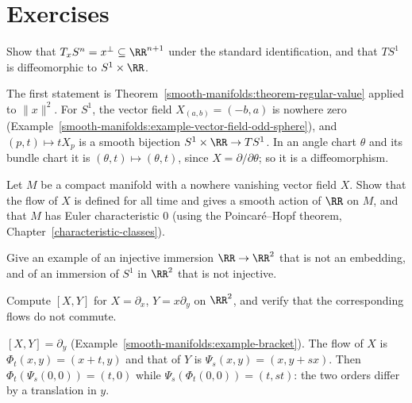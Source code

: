 \section{Exercises}\label{smooth-manifolds:section-exercises}

\begin{exercise}\label{smooth-manifolds:exercise-tangent-sphere}
Show that $T_xS^n = x^\perp \subseteq \RR^{n+1}$ under the standard identification, and that $TS^1$ is diffeomorphic to $S^1 \times \RR$.
\end{exercise}

\begin{solution}
The first statement is Theorem~\ref{smooth-manifolds:theorem-regular-value} applied to $\|x\|^2$. For $S^1$, the vector field $X_{(a,b)} = (-b, a)$ is nowhere
zero (Example~\ref{smooth-manifolds:example-vector-field-odd-sphere}), and $(p, t) \mapsto tX_p$ is a smooth bijection $S^1 \times \RR \to TS^1$. In an angle
chart $\theta$ and its bundle chart it is $(\theta, t) \mapsto (\theta, t)$, since $X = \partial/\partial\theta$; so it is a diffeomorphism.
\end{solution}

\begin{exercise}\label{smooth-manifolds:exercise-no-retraction-smooth}
Let $M$ be a compact manifold with a nowhere vanishing vector field $X$. Show that the flow of $X$ is defined for all time and gives a smooth action of $\RR$ on $M$, and that $M$ has Euler characteristic $0$
(using the Poincar\'e--Hopf theorem, Chapter~\ref{characteristic-classes}).
\end{exercise}

\begin{exercise}\label{smooth-manifolds:exercise-immersion-not-embedding}
Give an example of an injective immersion $\RR \to \RR^2$ that is not an embedding, and of an immersion of $S^1$ in $\RR^2$ that is not injective.
\end{exercise}

\begin{exercise}\label{smooth-manifolds:exercise-lie-bracket-computation}
Compute $[X, Y]$ for $X = \partial_x$, $Y = x\partial_y$ on $\RR^2$, and verify that the corresponding flows do not commute.
\end{exercise}

\begin{solution}
$[X, Y] = \partial_y$ (Example~\ref{smooth-manifolds:example-bracket}). The flow of $X$ is $\Phi_t(x, y) = (x + t, y)$ and that of $Y$ is
$\Psi_s(x, y) = (x, y + sx)$. Then $\Phi_t(\Psi_s(0, 0)) = (t, 0)$ while $\Psi_s(\Phi_t(0, 0)) = (t, st)$: the two orders differ by a translation in $y$.
\end{solution}


